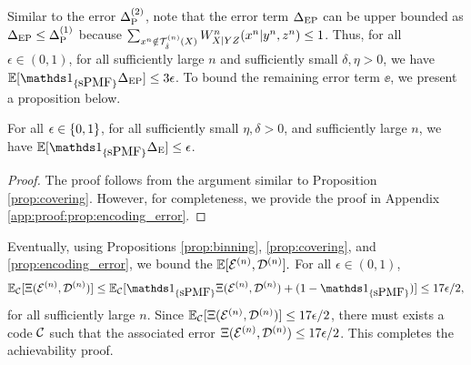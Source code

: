 \noindent Similar to the error $\Delta_{\text{P}}^{(2)}$, note that the error term ${\Delta}_{\text{EP}}$ can be upper bounded as ${\Delta}_{\text{EP}} \leq \Delta_{\text{P}}^{(1)}$ because $\sum_{x^n \notin \mathcal{T}_{\hat{\delta}}^{(n)}({X})} W^n_{X|YZ}(x^n|y^n,z^n) \leq 1$. Thus, for all $\epsilon \in (0,1)$, for all sufficiently large $n$ and sufficiently small $\delta, \eta > 0$, we have $\EE[\Ipmf \epe] \leq 3\epsilon$. To bound the remaining error term $\ee$, we present a proposition below.
\noindent \begin{proposition}\label{prop:encoding_error}
    For all $\epsilon \in \{0,1\}$, for all sufficiently small $\eta,\delta >0$, and sufficiently large $n$, we have $\EE[\Ipmf \ee] \leq \epsilon$.
\end{proposition}
\begin{proof}
The proof follows from the argument similar to Proposition \ref{prop:covering}. However, for completeness, we provide the proof in Appendix \ref{app:proof:prop:encoding_error}.
\end{proof}
Eventually, using Propositions \ref{prop:binning}, \ref{prop:covering}, and \ref{prop:encoding_error}, we bound the $\mathbb{E}[\mathcal{E}^{(n)}, \mathcal{D}^{(n)}].$ For all $\epsilon \in (0,1)$,
\begin{equation*}
    \EE_{\codebook}[\Xi(\encodern, \decodern)] \leq \EE_{\codebook}[\Ipmf \Xi(\encodern,\decodern) + (1-\Ipmf)] \leq 17\epsilon/2,
\end{equation*}
for all sufficiently large $n$. Since $\mathbb{E}_{\mathcal{C}}[\Xi(\mathcal{E}^{(n)}, \mathcal{D}^{(n)})] \leq 17\epsilon/2$, there must exists a code $\mathcal{C}$ such that the associated error $\Xi(\mathcal{E}^{(n)}, \mathcal{D}^{(n)}) \leq 17\epsilon/2$. This completes the achievability proof.

